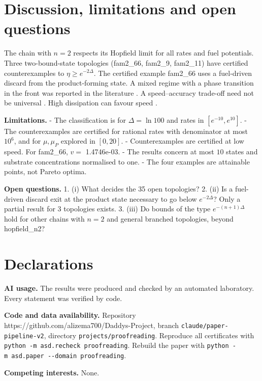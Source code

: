 \documentclass[11pt]{article}
\theoremstyle{definition}\newtheorem{definition}[theorem]{Definition}\newtheorem{example}[theorem]{Example}
\begin{document}
\section{Discussion, limitations and open questions}\label{discussion-limitations-and-open-questions}

The chain with \(n=2\) respects its Hopfield limit for all rates and fuel potentials. Three two-bound-state topologies (fam2\_66, fam2\_9, fam2\_11) have certified counterexamples to \(\eta\ge e^{-2\Delta}\). The certified example fam2\_66 uses a fuel-driven discard from the product-forming state. A mixed regime with a phase transition in the front was reported in the literature \cite{Berx20240232}. A speed--accuracy trade-off need not be universal \cite{Wu20265626}. High dissipation can favour speed \cite{Yu20220883}.

\textbf{Limitations.}
- The classification is for \(\Delta=\ln 100\) and rates in \([e^{-10},e^{10}]\).
- The counterexamples are certified for rational rates with denominator at most \(10^{6}\), and for \(\mu,\mu_P\) explored in \([0,20]\).
- Counterexamples are certified at low speed. For fam2\_66, \(v=\) 1.4746e-03.
- The results concern at most \(10\) states and substrate concentrations normalised to one.
- The four examples are attainable points, not Pareto optima.

\textbf{Open questions.}
1. (i) What decides the 35 open topologies?
2. (ii) Is a fuel-driven discard exit at the product state necessary to go below \(e^{-2\Delta}\)? Only a partial result for 3 topologies exists.
3. (iii) Do bounds of the type \(e^{-(n+1)\Delta}\) hold for other chains with \(n=2\) and general branched topologies, beyond hopfield\_n2?

\section{Declarations}\label{declarations}

\textbf{AI usage.} The results were produced and checked by an automated laboratory. Every statement was verified by code.

\textbf{Code and data availability.} Repository https://github.com/alizema700/Daddys-Project, branch \texttt{claude/paper-pipeline-v2}, directory \texttt{projects/proofreading}. Reproduce all certificates with \texttt{python\ -m\ asd.recheck\ proofreading}. Rebuild the paper with \texttt{python\ -m\ asd.paper\ -\/-domain\ proofreading}.

\textbf{Competing interests.} None.
\end{document}
